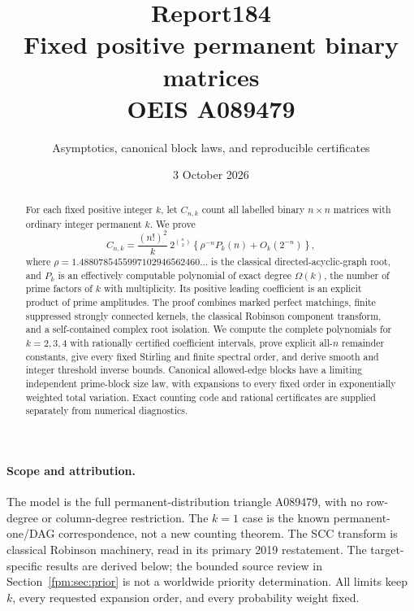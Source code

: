 \documentclass[11pt]{article}
\title{Report184\\[5pt]Fixed positive permanent binary matrices\\[3pt]OEIS A089479}
\author{Asymptotics, canonical block laws, and reproducible certificates}
\date{3 October 2026}
\theoremstyle{definition}\newtheorem{definition}[theorem]{Definition}
\theoremstyle{remark}\newtheorem{remark}[theorem]{Remark}
\begin{document}
\maketitle
\begin{abstract}
For each fixed positive integer $k$, let $C_{n,k}$ count all labelled binary $n\times n$ matrices with ordinary integer permanent $k$. We prove
\[
 C_{n,k}=\frac{(n!)^2}{k}\,2^{\binom n2}
 \left\{\rho^{-n}P_k(n)+O_k(2^{-n})\right\},
\]
where $\rho=1.4880785455997102946562460\ldots$ is the classical directed-acyclic-graph root, and $P_k$ is an effectively computable polynomial of exact degree $\Omega(k)$, the number of prime factors of $k$ with multiplicity. Its positive leading coefficient is an explicit product of prime amplitudes. The proof combines marked perfect matchings, finite suppressed strongly connected kernels, the classical Robinson component transform, and a self-contained complex root isolation. We compute the complete polynomials for $k=2,3,4$ with rationally certified coefficient intervals, prove explicit all-$n$ remainder constants, give every fixed Stirling and finite spectral order, and derive smooth and integer threshold inverse bounds. Canonical allowed-edge blocks have a limiting independent prime-block size law, with expansions to every fixed order in exponentially weighted total variation. Exact counting code and rational certificates are supplied separately from numerical diagnostics.
\end{abstract}

\paragraph{Scope and attribution.}
The model is the full permanent-distribution triangle A089479, with no row-degree or column-degree restriction. The $k=1$ case is the known permanent-one/DAG correspondence, not a new counting theorem. The SCC transform is classical Robinson machinery, read in its primary 2019 restatement. The target-specific results are derived below; the bounded source review in Section~\ref{fpm:sec:prior} is not a worldwide priority determination. All limits keep $k$, every requested expansion order, and every probability weight fixed.
\end{document}
